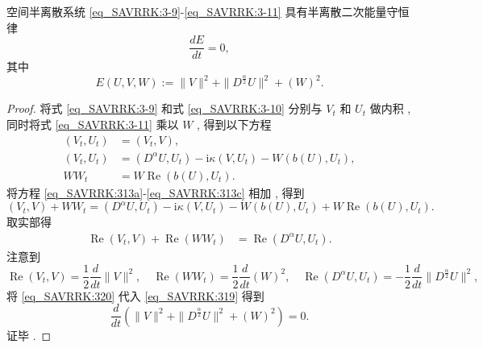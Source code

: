 \begin{theorem}	\label{thm3}
空间半离散系统 \eqref{eq_SAVRRK:3-9}-\eqref{eq_SAVRRK:3-11} 具有半离散二次能量守恒律
\begin{equation}
\frac{dE}{dt}=0 , \label{eq_SAVRRK:313a}
\end{equation}
其中
\begin{equation}
E(U , V , W):=\|V\|^2 + \|D^\frac{\alpha}{2} U\|^2+\left(W\right)^2 . \label{eq_SAVRRK:313}
\end{equation}
\end{theorem}

\begin{proof}
	将式 \eqref{eq_SAVRRK:3-9} 和式 \eqref{eq_SAVRRK:3-10} 分别与 $V_t$ 和 $U_t$ 做内积 , 
	同时将式 \eqref{eq_SAVRRK:3-11} 乘以 $W$ , 得到以下方程
\begin{align}
\left(V_t , U_t\right)&=\left(V_t , V\right) , \label{eq_SAVRRK:313a}\\
\left(V_t , U_t\right)&=\left(D^{\alpha} U , U_t\right)-\mathrm{i} \kappa\left(V , U_t\right)-W\left(b(U) , U_t\right) , \label{eq_SAVRRK:313b}\\
W W_t&=W\operatorname{Re}\left(b(U) , U_t\right) . \label{eq_SAVRRK:313c}
\end{align}
将方程 \eqref{eq_SAVRRK:313a}-\eqref{eq_SAVRRK:313c} 相加 , 得到
\begin{equation}
\left(V_t , V\right) + W W_t= \left(D^{\alpha} U , U_t\right)-\mathrm{i} \kappa\left(V , U_t\right)-W\left(b(U) , U_t\right) + W\operatorname{Re}\left(b(U) , U_t\right) . 
\end{equation}
取实部得
\begin{align}
\operatorname{Re}\left(V_t , V\right) + \operatorname{Re}\left(W W_t\right)&= \operatorname{Re}\left(D^{\alpha} U , U_t\right) . \label{eq_SAVRRK:319}
\end{align}
注意到
\begin{equation}
\operatorname{Re}\left(V_t , V\right) = \frac{1}{2}\frac{d }{d t}\|V\|^2 , \quad \operatorname{Re}\left(W W_t\right) = \frac{1}{2}\frac{d }{d t}\left(W\right)^2 , \quad \operatorname{Re}\left(D^{\alpha} U , U_t\right)=-\frac{1}{2}\frac{d }{d t}\|D^\frac{\alpha}{2}U\|^2 , \label{eq_SAVRRK:320}
\end{equation}
将 \eqref{eq_SAVRRK:320} 代入 \eqref{eq_SAVRRK:319} 得到
\begin{equation}
\frac{d }{d t}\left(\|V\|^2+\|D^\frac{\alpha}{2}U\|^2+\left(W\right)^2\right)=0 . 
\end{equation}
证毕 . 
\end{proof}

